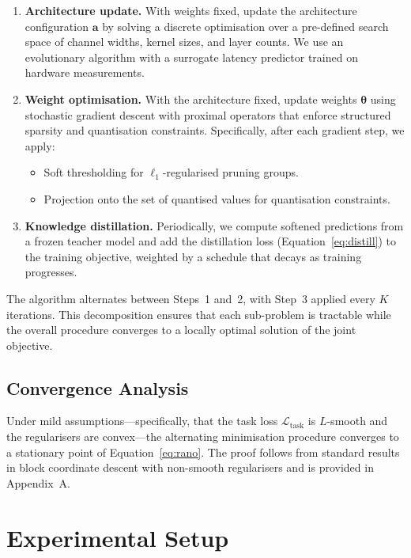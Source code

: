 \documentclass[12pt,a4paper,oneside]{book}
\begin{document}
\begin{enumerate}[label=\textbf{Step \arabic*},leftmargin=2.5em]
  \item \textbf{Architecture update.} With weights fixed, update the
  architecture configuration $\mathbf{a}$ by solving a discrete
  optimisation over a pre-defined search space of channel widths, kernel
  sizes, and layer counts. We use an evolutionary algorithm with a
  surrogate latency predictor trained on hardware measurements.

  \item \textbf{Weight optimisation.} With the architecture fixed,
  update weights $\boldsymbol{\theta}$ using stochastic gradient descent
  with proximal operators that enforce structured sparsity and
  quantisation constraints. Specifically, after each gradient step, we
  apply:
  \begin{itemize}
    \item Soft thresholding for $\ell_1$-regularised pruning groups.
    \item Projection onto the set of quantised values for quantisation
    constraints.
  \end{itemize}

  \item \textbf{Knowledge distillation.} Periodically, we compute
  softened predictions from a frozen teacher model and add the
  distillation loss (Equation~\ref{eq:distill}) to the training
  objective, weighted by a schedule that decays as training progresses.
\end{enumerate}

The algorithm alternates between Steps~1 and~2, with Step~3 applied
every $K$ iterations. This decomposition ensures that each sub-problem
is tractable while the overall procedure converges to a locally optimal
solution of the joint objective.

\subsection{Convergence Analysis}

Under mild assumptions---specifically, that the task loss
$\mathcal{L}_{\text{task}}$ is $L$-smooth and the regularisers are
convex---the alternating minimisation procedure converges to a
stationary point of Equation~\ref{eq:rano}. The proof follows from
standard results in block coordinate descent with non-smooth
regularisers and is provided in Appendix~A.

\section{Experimental Setup}
\end{document}

